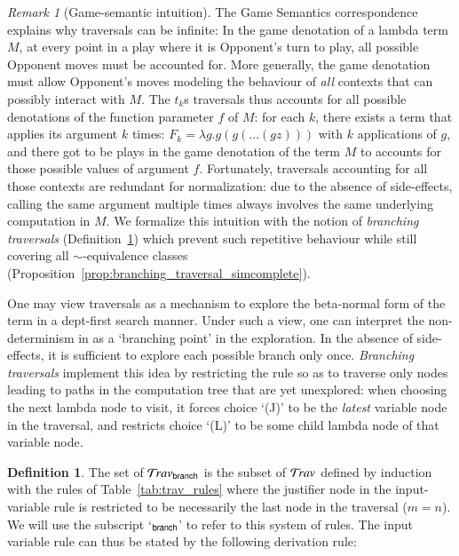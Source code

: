 \documentclass{elsarticle}
\theoremstyle{plain}
\theoremstyle{definition}
\newtheorem{definition}{Definition}[section]
\theoremstyle{remark}
\newtheorem{remark}{Remark}[section]
\newcommand\Nodes{\mathcal{N}}%
\newcommand\NodesVar{\Nodes_{\sf var}}%
\newcommand{\branching}{{\sf branch}}
\newcommand{\travsetbr}{{\travset_\branching}}
\newcommand{\travulc}{\travset}
\newcommand{\rulefont}[1]{\mathbf{\sf #1}}
\newcommand{\enables}{\vdash} %
\newcommand{\ExtNodes}{\Nodes^{\sf ext}}
\begin{document}
\begin{remark}[Game-semantic intuition]
The Game Semantics correspondence explains why traversals can be infinite: In the game denotation of a lambda term $M$, at every point in a play where it is Opponent's turn to play, all possible Opponent moves must be accounted for. More generally, the game denotation must allow Opponent's moves modeling the behaviour of \emph{all} contexts that can possibly interact with $M$. The $t_k$s traversals thus accounts for all possible denotations of the function parameter $f$ of $M$: for each $k$, there exists a term that applies its argument $k$ times: $F_k = \lambda g . g (g ( \ldots (g z)))$ with $k$ applications of $g$, and there got to be plays in the game denotation of the term $M$ to accounts for those possible values of argument $f$. Fortunately, traversals accounting for all those contexts are redundant for normalization: due to the absence of side-effects, calling the same argument multiple times always involves the same underlying computation in $M$. We formalize this intuition with the notion of \emph{branching traversals} (Definition~\ref{dfn:branching_traversals})  which prevent such repetitive behaviour while still covering all $\sim$-equivalence classes (Proposition~\ref{prop:branching_traversal_simcomplete}).
\end{remark}

One may view traversals as a mechanism to explore the beta-normal form of the term in a dept-first search manner. Under such a view, one can interpret the non-determinism in  as a `branching point' in the exploration. In the absence of side-effects, it is sufficient to explore each possible branch only once. \emph{Branching traversals} implement this idea by restricting the rule  so as to traverse only nodes leading to paths in the computation tree that are yet unexplored: when choosing the next lambda node to visit, it forces choice `(J)' to be the \emph{latest} variable node in the traversal, and restricts choice `(L)' to be some child lambda node of that variable node.

\begin{definition}
\label{dfn:branching_traversals}
The set of  $\travsetbr$ is the subset of $\travulc$ defined by induction with the rules of Table~\ref{tab:trav_rules} where the justifier node in the
input-variable rule  is restricted to be necessarily the last node in the traversal ($m=n$).
We will use the subscript `${}_\branching$' to refer to this system of rules. The input variable rule can thus be stated by the following derivation rule:
\infrule[$\rulefont{IVar_\branching}$]
     {t \cdot n \in\travsetbr
      \andalso n \in\ExtNodes\inter\NodesVar
      \andalso n \enables_i\alpha
      \andalso i \geq 1
     }
     { \in \travsetbr}
\end{definition}
\end{document}
